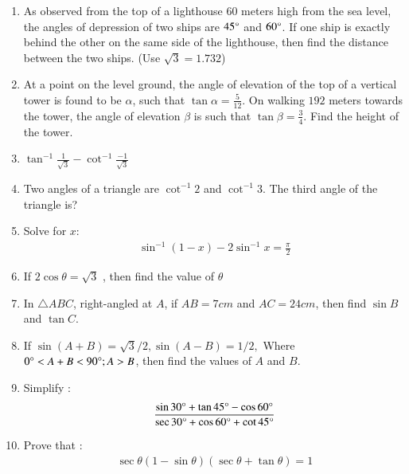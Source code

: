 \begin{enumerate}
    \hfill{}\item As observed from the top of a lighthouse $60$ meters high from the sea level, the angles of depression of two ships are $45\degree$ and $60\degree$. If one ship is exactly behind the other on the same side of the lighthouse, then find the distance between the two ships. (Use $\sqrt{3} = 1.732$)
    
    \hfill{}\item At a point on the level ground, the angle of elevation of the top of a vertical tower is found to be $\alpha$, such that $\tan\alpha = \frac{5}{12}$. On walking $192$ meters towards the tower, the angle of elevation $\beta$ is such that $\tan\beta = \frac{3}{4}$. Find the height of the tower.
    
    \hfill{}\item $\tan^{-1}\frac{1}{\sqrt{3}} - \cot^{-1}\frac{-1}{\sqrt{3}}$
    
    \hfill{}\item Two angles of a triangle are $\cot^{-1}2$ and $\cot^{-1}3$. The third angle of the triangle is?
    
    \hfill{}\item Solve for $x$:
    \begin{align}
        \sin^{-1}(1-x) - 2 \sin^{-1} x = \frac{\pi}{2}
    \end{align}
\hfill{}
\item If $2\cos  \theta = \sqrt{3}$ , then find the value of $\theta$
\hfill{}\item  In $\triangle ABC$, right-angled at $A$, if $AB=7 cm$ and $AC=24 cm$, then find $\sin B$
and $\tan C$.

\hfill{}\item If  $\sin (A+B) = \sqrt{3}/2,
 \sin (A-B) = 1/2,$ Where $0\degree<A+B<90\degree; A>B$, then find the values of $A$ and $B$.

\hfill{}\item  Simplify :
\begin{align}
\frac{\sin 30\degree + \tan 45\degree-\cos 60\degree}{\sec 30\degree + \cos 60\degree + \cot 45\degree} 
\end{align}


\hfill{}\item Prove that :
\begin{align}
 \sec \theta (1-\sin\theta)(\sec\theta+ \tan\theta)=1
\end{align}


\end{enumerate}
